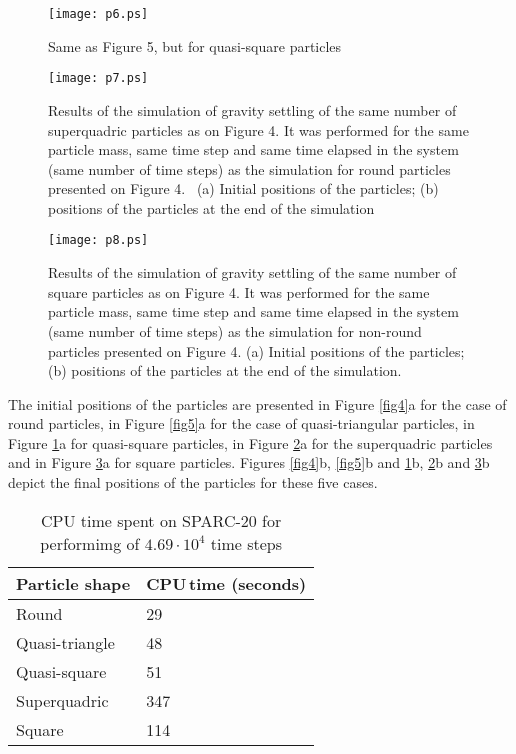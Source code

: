 \documentclass[granma]{svjour}
\begin{document}
\begin{figure}[!t]
\texttt{[image: p6.ps]}
\caption{Same as Figure 5, but for quasi-square particles}\label{fig6}
\end{figure}

\begin{figure}[!t]
\texttt{[image: p7.ps]}
\caption{Results of the simulation of gravity settling of the same number of
superquadric particles \cite{will89} as on Figure 4. It was
performed
for the same particle mass, same time step and same time elapsed in the
system (same number of time steps) as the simulation for round particles
presented on Figure 4. \ (a) Initial positions of the particles; (b)
positions of the particles at the end of the simulation}\label{fig7}
\end{figure}

\begin{figure}[!t]
\texttt{[image: p8.ps]}
\caption{Results of the simulation of gravity settling of the same number of
square particles as on Figure 4. It was performed for the same particle mass,
same time step and same time elapsed in the system (same number of time
steps) as the simulation for non-round particles presented on Figure 4. (a)
Initial positions of the particles; (b) positions of the particles at the end
of the simulation.
}\label{fig8}
\end{figure}

The initial positions of the particles are presented in Figure
\ref{fig4}a for the
case of round particles, in Figure \ref{fig5}a for the case of
quasi-triangular
particles, in Figure \ref{fig6}a for quasi-square particles, in Figure
\ref{fig7}a for the
superquadric particles and in Figure \ref{fig8}a for square particles.
Figures
\ref{fig4}b,
\ref{fig5}b and \ref{fig6}b, \ref{fig7}b and \ref{fig8}b depict the
final positions of the particles for these five cases.

\begin{table}
\caption{CPU time spent on SPARC-20 for performimg of $4.69
\cdot
10^4$ time steps}\label{tab1}
\begin{tabular}[t]{|l|l|}
\hline
Particle shape&CPU$\,$time (seconds)\\
\hline
Round &29\\
\hline
Quasi-triangle&48\\
\hline
Quasi-square&51\\
\hline
Superquadric&347\\
\hline
Square&114\\
\hline
\end{tabular}%
\end{table}
\end{document}
